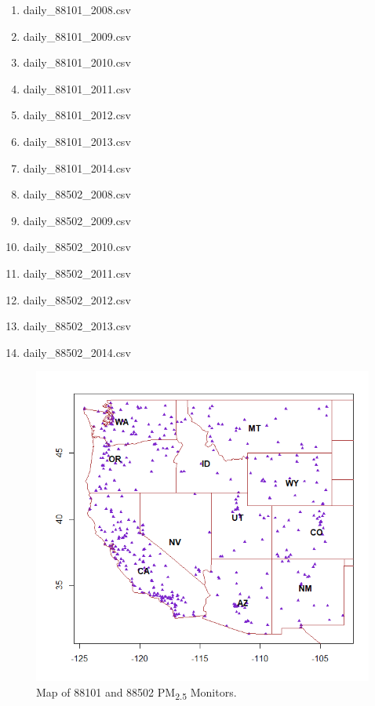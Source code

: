 \begin{enumerate}
\item daily\_88101\_2008.csv
\item daily\_88101\_2009.csv
\item daily\_88101\_2010.csv
\item daily\_88101\_2011.csv
\item daily\_88101\_2012.csv
\item daily\_88101\_2013.csv
\item daily\_88101\_2014.csv
\item daily\_88502\_2008.csv
\item daily\_88502\_2009.csv
\item daily\_88502\_2010.csv
\item daily\_88502\_2011.csv
\item daily\_88502\_2012.csv
\item daily\_88502\_2013.csv
\item daily\_88502\_2014.csv
\end{enumerate} 

\begin{figure}[H] %
\includegraphics[width=1\textwidth]{m88101and88502notitlenorlabels.PNG} %
\caption{\label{fig:MapLocations}Map of 88101 and 88502 PM\textsubscript{2.5} Monitors.} %
\end{figure} %
